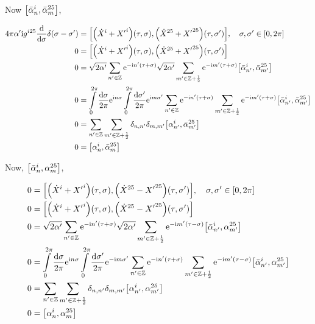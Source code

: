 Now $\comm{{\bar\alpha}^i_n}{{\bar\alpha}^{25}_m}$,

\begin{align*}
    4\pi\alpha'\im g^{i25}\dv{}{\sigma}\delta\qty(\sigma-\sigma')&=\comm{\qty({\dot X}^i+{X'}^i)\qty(\tau,\sigma)}{\qty({\dot X}^{25}+{X'}^{25})\qty(\tau,\sigma')},\ \ \ \sigma,\sigma'\in\qty[0,2\pi]\\
    0&=\comm{\qty({\dot X}^i+{X'}^i)\qty(\tau,\sigma)}{\qty({\dot X}^{25}+{X'}^{25})\qty(\tau,\sigma')}\\
    0&=\sqrt{2\alpha'}\sum\limits_{n'\in\mathbb Z}\e^{-\im n'\qty(\tau+\sigma)}\sqrt{2\alpha'}\sum\limits_{m'\in\mathbb Z+\frac12}\e^{-\im m'\qty(\tau+\sigma)}\comm{{\bar\alpha}^i_{n'}}{{\bar\alpha}^{25}_{m'}}\\
    0&=\int\limits_0^{2\pi}\frac{\dd{\sigma}}{2\pi}\e^{\im n\sigma}\int\limits_0^{2\pi}\frac{\dd{\sigma'}}{2\pi}\e^{\im m\sigma'}\sum\limits_{n'\in\mathbb Z}\e^{-\im n'\qty(\tau+\sigma)}\sum\limits_{m'\in\mathbb Z+\frac12}\e^{-\im m'\qty(\tau+\sigma)}\comm{{\bar\alpha}^i_{n'}}{{\bar\alpha}^{25}_{m'}}\\
    0&=\sum\limits_{n'\in\mathbb Z}\sum\limits_{m'\in\mathbb Z+\frac12}\delta_{n,n'}\delta_{m,m'}\comm{\alpha^i_{n'}}{{\bar\alpha}^{25}_{m'}}\\
    0&=\comm{\alpha^i_{n}}{{\bar\alpha}^{25}_{m}}
\end{align*}

Now, $\comm{{\bar\alpha}_n^i}{{\alpha}_m^{25}}$,

\begin{align*}
    0&=\comm{\qty({\dot X}^i+{X'}^i)\qty(\tau,\sigma)}{\qty({\dot X}^{25}-{X'}^{25})\qty(\tau,\sigma')},\ \ \ \sigma,\sigma'\in\qty[0,2\pi]\\
    0&=\comm{\qty({\dot X}^i+{X'}^i)\qty(\tau,\sigma)}{\qty({\dot X}^{25}-{X'}^{25})\qty(\tau,\sigma')}\\
    0&=\sqrt{2\alpha'}\sum\limits_{n'\in\mathbb Z}\e^{-\im n'\qty(\tau+\sigma)}\sqrt{2\alpha'}\sum\limits_{m'\in\mathbb Z+\frac12}\e^{-\im m'\qty(\tau-\sigma)}\comm{{\bar\alpha}^i_{n'}}{{\alpha}^{25}_{m'}}\\
    0&=\int\limits_0^{2\pi}\frac{\dd{\sigma}}{2\pi}\e^{\im n\sigma}\int\limits_0^{2\pi}\frac{\dd{\sigma'}}{2\pi}\e^{-\im m\sigma'}\sum\limits_{n'\in\mathbb Z}\e^{-\im n'\qty(\tau+\sigma)}\sum\limits_{m'\in\mathbb Z+\frac12}\e^{-\im m'\qty(\tau-\sigma)}\comm{{\bar\alpha}^i_{n'}}{{\alpha}^{25}_{m'}}\\
    0&=\sum\limits_{n'\in\mathbb Z}\sum\limits_{m'\in\mathbb Z+\frac12}\delta_{n,n'}\delta_{m,m'}\comm{\alpha^i_{n'}}{{\alpha}^{25}_{m'}}\\
    0&=\comm{\alpha^i_{n}}{{\alpha}^{25}_{m}}
\end{align*}

